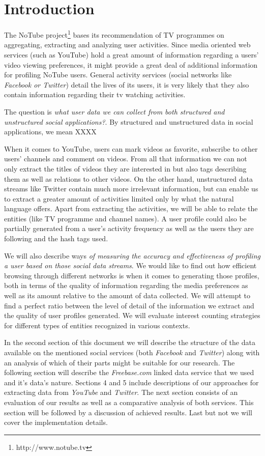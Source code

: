 \section{Introduction}

The NoTube project\footnote[1]{http://www.notube.tv} bases its recommendation of TV programmes on aggregating, extracting and analyzing user activities. Since media oriented web services (such as YouTube) hold a great amount of information regarding a users' video viewing preferences, it might provide a great deal of additional information for profiling NoTube users. General activity services (social networks like \textit{Facebook or Twitter}) detail the lives of its users, it is very likely that they also contain information regarding their tv watching activities.

The question is \textit{what user data we can collect from both structured and unstructured social applications?}. By structured and unstructured data in social applications, we mean XXXX

When it comes to YouTube, users can mark videos as favorite, subscribe to other users' channels and comment on videos. From all that information we can not only extract the titles of videos they are interested in but also tags describing them as well as relations to other videos. On the other hand, unstructured data streams like Twitter contain much more irrelevant information, but can enable us to extract a greater amount of activities limited only by what the natural language offers. Apart from extracting the activities, we will be able to relate the entities (like TV programme and channel names). A user profile could also be partially generated from a user's activity frequency as well as the users they are following and the hash tags used.

We will also describe ways \textit{of measuring the accuracy and effectiveness of profiling a user based on those social data streams}. We would like to find out how efficient browsing through different networks is when it comes to generating those profiles, both in terms of the quality of information regarding the media preferences as well as its amount relative to the amount of data collected. We will attempt to find a perfect ratio between the level of detail of the information we extract and the quality of user profiles generated. We will evaluate interest counting strategies for different types of entities recognized in various contexts.

In the second section of this document we will describe the structure of the data available on the mentioned social services (both \textit{Facebook} and \textit{Twitter}) along with an analysis of which of their parts might be suitable for our research. The following section will describe the \textit{Freebase.com} linked data service that we used and it's data's nature. Sections 4 and 5 include descriptions of our approaches for extracting data from \textit{YouTube} and \textit{Twitter}. The next section consists of an evaluation of our results as well as a comparative analysis of both services. This section will be followed by a discussion of achieved results. Last but not we will cover the implementation details.

